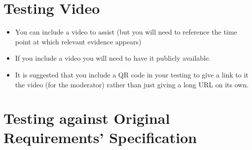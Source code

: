\section{Testing Video}
\begin{itemize}
    \item You can include a video to assist (but you will need to reference the time point at which relevant evidence appears)
    \item If you include a video you will need to have it publicly available.
    \item It is suggested that you include a QR code in your testing to give a link to it the video (for the moderator) rather than just giving a long URL on its own.
\end{itemize}

\section{Testing against Original Requirements' Specification}
